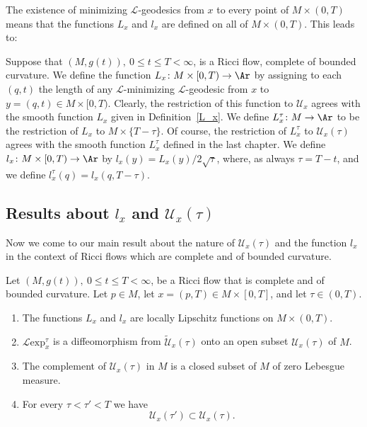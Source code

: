 The existence of minimizing ${\mathcal L}$-geodesics from $x$ to
every point of $M\times (0,T)$ means that the functions $L_{x}$ and
$l_{x}$ are defined on all of $M\times (0,T)$. This leads to:

\begin{definition}
\label{def:reduced-length-global}
 Suppose that $(M,g(t)),\ 0\le t\le T<\infty$, is a Ricci
flow, complete of bounded curvature.  We define the function
$L_{x}\colon M\times [0,T)\to \Ar$ by assigning to each $(q,t)$ the
length of any ${\mathcal L}$-minimizing ${\mathcal L}$-geodesic from
$x$ to $y=(q,t)\in M\times [0,T)$. Clearly, the restriction of this
function to ${\mathcal U}_{x}$ agrees with the smooth function
$L_{x}$ given in Definition~\ref{L_x}. We define
 $L_{x}^\tau\colon M\to \Ar$ to be the restriction of $L_x$ to
 $M\times \{T-\tau\}$.
Of course, the restriction of $L_{x}^\tau$ to ${\mathcal
U}_{x}(\tau)$ agrees with the smooth function $L_{x}^\tau$ defined
in the last chapter. We define $l_{x}\colon M\times [0,T)\to \Ar$ by
$l_{x}(y)=L_{x}(y)/2\sqrt{\tau}$, where, as always $\tau=T-t$, and
we define $l_{x}^\tau(q)=l_{x}(q,T-\tau)$.
\end{definition}





\subsection{Results about $l_{x}$ and ${\mathcal
U}_{x}(\tau)$}

Now we come to our main result about the nature of ${\mathcal
U}_{x}(\tau)$ and the function $l_{x}$
in the context of Ricci flows which are complete and of bounded
curvature.



\begin{proposition}
\label{prop:l-exp-lipschitz-complete}
\label{lipcomplete}
Let $(M,g(t)),\ 0\le t\le T<\infty$, be a Ricci flow that is
complete and of bounded curvature. Let $p\in M$, let $x=(p,T)\in
M\times [0,T]$, and let $\tau\in (0,T)$.
\begin{enumerate}
\item[(1)] The functions $L_{x}$ and $l_{x}$ are locally Lipschitz functions
on $M\times (0,T)$.
\item[(2)] ${\mathcal L}\mathrm{exp}_{x}^\tau$
 is a diffeomorphism from $\widetilde{\mathcal U}_{x}(\tau)$ onto
an open subset ${\mathcal U}_{x}(\tau)$ of $M$.
\item[(3)] The complement of ${\mathcal U}_{x}(\tau)$ in $M$ is a closed
subset of $M$ of zero Lebesgue measure. \item[(4)]
 For every
$\tau<\tau'<T$ we have
$${\mathcal U}_{x}(\tau')\subset {\mathcal U}_{x}(\tau).$$
\end{enumerate}
\end{proposition}


